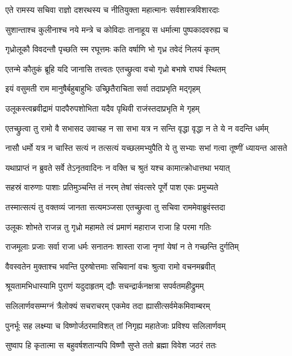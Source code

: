 \twolineshloka
{एते रामस्य सचिवा राज्ञो दशरथस्य च}
{नीतियुक्ता महात्मानः सर्वशास्त्रविशारदाः}%

\twolineshloka
{सुशान्ताश्च कुलीनाश्च नये मन्त्रे च कोविदाः}
{तानाहूय स धर्मात्मा पुष्पकादवरुह्य च}%

\twolineshloka
{गृध्रोलूकौ विवदन्तौ पृच्छति स्म रघूत्तमः}
{कति वर्षाणि भो गृध्र तवेदं निलयं कृतम्}%

\twolineshloka
{एतन्मे कौतुकं ब्रूहि यदि जानासि तत्त्वतः}
{एतच्छ्रुत्वा वचो गृध्रो बभाषे राघवं स्थितम्}%

\twolineshloka
{इयं वसुमती राम मानुषैर्बहुबाहुभिः}
{उच्छ्रितैराचिता सर्वा तदाप्रभृति मद्गृहम्}%

\twolineshloka
{उलूकस्त्वब्रवीद्रामं पादपैरुपशोभिता}
{यदैव पृथिवी राजंस्तदाप्रभृति मे गृहम्}%

\twolineshloka
{एतच्छ्रुत्वा तु रामो वै सभासद उवाचह}
{न सा सभा यत्र न सन्ति वृद्धा वृद्धा न ते ये न वदन्ति धर्मम्}%

\twolineshloka
{नासौ धर्मो यत्र न चास्ति सत्यं न तत्सत्यं यच्छलमभ्युपैति}
{ये तु सभ्याः सभां गत्वा तूष्णीं ध्यायन्त आसते}%

\twolineshloka
{यथाप्राप्तं न ब्रुवते सर्वे तेऽनृतवादिनः}
{न वक्ति च श्रुतं यश्च कामात्क्रोधात्तथा भयात्}%

\twolineshloka
{सहस्रं वारुणाः पाशाः प्रतिमुञ्चन्ति तं नरम्}
{तेषां संवत्सरे पूर्णे पाश एकः प्रमुच्यते}%

\twolineshloka
{तस्मात्सत्यं तु वक्तव्यं जानता सत्यमञ्जसा}
{एतच्छ्रुत्वा तु सचिवा राममेवाब्रुवंस्तदा}%

\twolineshloka
{उलूकः शोभते राजन्न तु गृध्रो महामते}
{त्वं प्रमाणं महाराज राजा हि परमा गतिः}%

\twolineshloka
{राजमूलाः प्रजाः सर्वा राजा धर्मः सनातनः}
{शास्ता राजा नृणां येषां न ते गच्छन्ति दुर्गतिम्}%

\twolineshloka
{वैवस्वतेन मुक्ताश्च भवन्ति पुरुषोत्तमाः}
{सचिवानां वचः श्रुत्वा रामो वचनमब्रवीत्}%

\twolineshloka
{श्रूयतामभिधास्यामि पुराणं यदुदाहृतम्}
{द्यौः सचन्द्रार्कनक्षत्रा सपर्वतमहीद्रुमम्}%

\twolineshloka
{सलिलार्णवसम्मग्नं त्रैलोक्यं सचराचरम्}
{एकमेव तदा ह्यासीत्सर्वमेकमिवाम्बरम्}%

\twolineshloka
{पुनर्भूः सह लक्ष्म्या च विष्णोर्जठरमाविशत्}
{तां निगृह्य महातेजाः प्रविश्य सलिलार्णवम्}%

\twolineshloka
{सुष्वाप हि कृतात्मा स बहुवर्षशतान्यपि}
{विष्णौ सुप्ते ततो ब्रह्मा विवेश जठरं ततः}%

